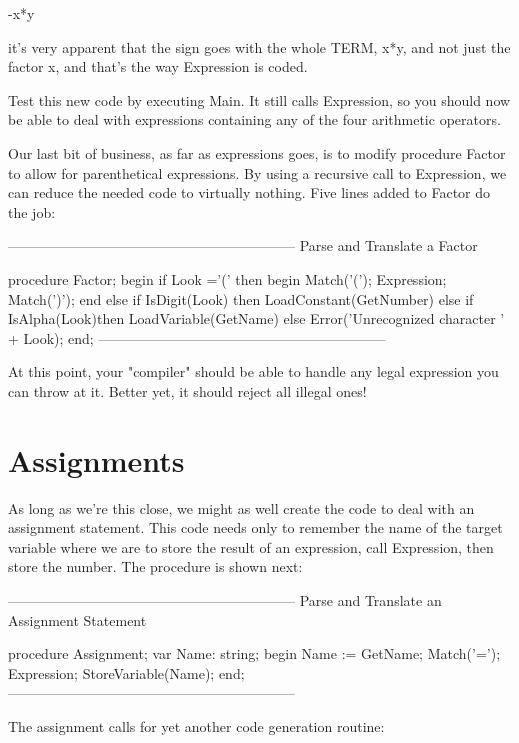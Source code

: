 \documentclass[float=false, crop=false]{standalone}
\begin{document}
	-x*y

it's very apparent that the sign goes with the whole TERM, x*y, and not just the
factor x, and that's the way Expression is coded.

Test this new code by executing Main. It still calls Expression, so you should
now be able to deal with expressions containing any of the four arithmetic
operators.

Our last bit of business, as far as expressions goes, is to modify
procedure Factor to allow for parenthetical expressions.  By using a
recursive call to Expression, we can reduce the needed code to virtually
nothing.  Five lines added to Factor do the job:

\begin{code}
{--------------------------------------------------------------}
{ Parse and Translate a Factor }

procedure Factor;
begin
	if Look ='(' then begin
		Match('(');
		Expression;
		Match(')');
		end
	else if IsDigit(Look) then
		LoadConstant(GetNumber)
	else if IsAlpha(Look)then
		LoadVariable(GetName)
	else
		Error('Unrecognized character ' + Look);
end;
{--------------------------------------------------------------}
\end{code}

At this point, your "compiler" should be able to handle any legal
expression you can throw at it.  Better yet, it should reject all
illegal ones!

\section{Assignments}

As long as we're this close, we might as well create the code to deal with an
assignment statement. This code needs only to remember the name of the target
variable where we are to store the result of an expression, call Expression,
then store the number. The procedure is shown next:

\begin{code}
{--------------------------------------------------------------}
{ Parse and Translate an Assignment Statement }

procedure Assignment;
var Name: string;
begin
	Name := GetName;
	Match('=');
	Expression;
	StoreVariable(Name);
end;
{--------------------------------------------------------------}
\end{code}

The assignment calls for yet another code generation routine:
\end{document}
